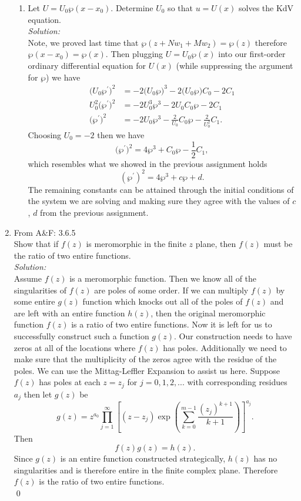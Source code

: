\documentclass[10pt]{amsart}
\theoremstyle{nonumberplain}
\begin{document}
\begin{enumerate}[label={\bf {\arabic*}:}]
\begin{enumerate}
\item Let $U=U_0 \wp\left(x-x_0\right)$. Determine $U_0$ so that $u=U(x)$ solves the KdV equation.\\

\noindent
\textit{Solution:} \\
Note, we proved last time that $\wp(z + N w_1 + M w_2) = \wp(z)$ therefore $\wp(x - x_0) = \wp(x)$.
Then plugging $U=U_0 \wp(x)$ into our first-order ordinary differential equation for $U(x)$ (while suppressing the argument for $\wp$) we have
\begin{align*}
\big(U_0 \wp^\prime\big)^2 &=  - 2 \big(U_0 \wp\big)^3 - 2 \big(U_0 \wp\big)C_0 - 2C_1 \\
U_0^2 \big(\wp^\prime\big)^2 &= -2 U_0^3 \wp^3 - 2 U_0 C_0 \wp - 2C_1 \\
\big(\wp^\prime\big)^2 &= -2 U_0 \wp^3 - \frac 2 {U_0} C_0 \wp - \frac 2 {U_0^2} C_1.
\end{align*}
Choosing $U_0 = -2$ then we have
$$
\big(\wp^\prime\big)^2 = 4 \wp^3 + C_0 \wp - \frac 1 2 C_1,
$$
which resembles what we showed in the previous assignment holds
$$
(\wp^\prime)^2 = 4\wp^3 + c \wp + d.
$$
The remaining constants can be attained through the initial conditions of the system we are solving and making sure they agree with the values of $c$, $d$ from the previous assignment.
\end{enumerate}
\newpage

\item From A\&F: 3.6.5\\
Show that if $f (z)$ is meromorphic in the finite $z$ plane, then $f (z)$ must be
the ratio of two entire functions. \\

\noindent
\textit{Solution:} \\
Assume $f(z)$ is a meromorphic function.
Then we know all of the singularities of $f(z)$ are poles of some order.
If we can multiply $f(z)$ by some entire $g(z)$ function which knocks out all of the poles of $f(z)$ and are left with an entire function $h(z)$, then the original meromorphic function $f(z)$ is a ratio of two entire functions.
Now it is left for us to successfully construct such a function $g(z)$.
Our construction needs to have zeros at all of the locations where $f(z)$ has poles.
Additionally we need to make sure that the multiplicity of the zeros agree with the residue of the poles.
We can use the Mittag-Leffler Expansion to assist us here.
Suppose $f(z)$ has poles at each $z = z_j$ for $j = 0, 1, 2, ...$ with corresponding residues $a_j$ then let $g(z)$ be
$$
g(z) = z^{a_0} \prod_{j=1}^\infty \left[ (z - z_j) \exp\left(\sum_{k=0}^{m-1}\frac{(z_j)^{k + 1}}{k + 1}\right) \right]^{a_j}.
$$
Then
$$
f(z)g(z) = h(z).
$$
Since $g(z)$ is an entire function constructed strategically, $h(z)$ has no singularities and is therefore entire in the finite complex plane.
Therefore $f(z)$ is the ratio of two entire functions. \\
\qed


\end{enumerate}
\end{document}
